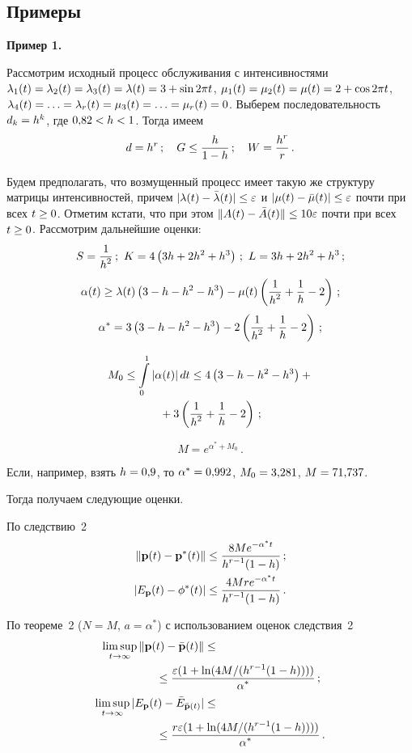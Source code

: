 \begin{multicols}{2}
\vspace*{-9pt}

\section{Примеры}

\noindent
\textbf{Пример 1.}

Рассмотрим исходный процесс обслуживания с интенсивностями 
$\la_1(t)\hm=\la_2(t)\hm=\la_3(t)\hm=\la(t) \hm= 3\hm+\sin{2\pi t}$, 
$\mu_1(t)\hm=\mu_2(t)\hm=  \mu(t) \hm= 2\hm+\cos{2\pi t}$, 
$\la_4(t)=\ldots=\la_r(t)\hm=\mu_3(t)=\ldots=\mu_r(t)\hm=0$. Выберем последовательность  
$d_k\hm=h^k$, где $0{,}82 \hm< h \hm<1$. Тогда имеем
$$
d=h^r\,; \quad G \le \displaystyle\frac{\displaystyle h\mathstrut}{\displaystyle 1-h\mathstrut}\,; \quad W=\displaystyle\frac{\displaystyle h^r\mathstrut}{\displaystyle r\mathstrut}\,.
$$

Будем предполагать, что возмущенный процесс имеет такую же структуру 
мат\-ри\-цы интенсивностей, причем $|\la(t)\hm-\bar{\la}(t)| \hm\le \varepsilon$ 
и  $|\mu(t)\hm-\bar{\mu}(t)| \hm\le \varepsilon$ почти при всех $t \hm\ge 0$. 
Отметим кстати, что при этом $\| A(t)\hm-\bar{A}(t)\| \hm\le 10 \varepsilon$ почти при 
всех $t \hm\ge 0$. Рассмотрим дальнейшие оценки:
$$
S=\displaystyle\frac{\displaystyle 1\mathstrut}{\displaystyle h^2\mathstrut}\,; \ K=4 \left(3h+2h^2+h^3\right)\,; \ L=3h+2h^2+h^3\,;
$$
$$
\alpha(t) \ge \lambda(t)\left(3 - h - h^2 -h^3\right)-\mu(t)\left(\displaystyle\frac{\displaystyle 1\mathstrut}{\displaystyle h^2\mathstrut}+\displaystyle\frac{\displaystyle 1\mathstrut}{\displaystyle h\mathstrut}-2\right)\,;
$$
$$
\alpha^*= 3\left(3 - h - h^2 -h^3\right)-2\left(\displaystyle\frac{\displaystyle 1\mathstrut}{\displaystyle h^2\mathstrut}+\displaystyle\frac{\displaystyle 1\mathstrut}{\displaystyle h\mathstrut}-2\right)\,;
$$


\noindent
\begin{multline*}
M_0 \le \int\limits_0^1 |\alpha(t)|\, dt \le 4\left(3 - h - h^2 -h^3\right)+{}\\
{}+
3\left(\displaystyle\frac{\displaystyle 1\mathstrut}{\displaystyle h^2\mathstrut}+\displaystyle\frac{\displaystyle 1\mathstrut}{\displaystyle h\mathstrut}-2\right)\,;
\end{multline*}

\vspace*{-9pt}

\noindent
$$
M=e^{\alpha^*+M_0}\,.
$$

Если, например, взять 
$h\hm=0{,}9$, то $\alpha^*\hm=0{,}992$, $M_0\hm=3{,}281$, $M\hm=71{,}737$.

Тогда получаем следующие оценки.

По следствию~2
\begin{align*}
 \|{\bf p}(t)- {\bf p^{*}}(t)\| &\le \displaystyle\frac{\displaystyle 8Me^{-\alpha^*t}\mathstrut}{\displaystyle h^{r-1}(1-h)\mathstrut}\,;\\
|E_{\bf p}(t)-\phi^*(t)| &\le  \displaystyle\frac{\displaystyle 4Mre^{-\alpha^*t}\mathstrut}{\displaystyle h^{r-1}(1-h)\mathstrut}\,.
\end{align*}

По теореме~2 ($N=M$, $a=\alpha^*$) с использованием оценок следствия~2
\begin{align*}
\limsup\limits_{t \to \infty} \|{\bf p}(t)- \bar{\bf p}(t)\| &\le{} \notag\\
&\hspace*{-15mm}{}\le \fr{\varepsilon(1+\ln({4M}/({h^{r-1}(1-h)})))}{\alpha^*}\,;\\
\limsup\limits_{t \to \infty}   |E_{\bf p}(t)- \bar{E}_{\bar{\bf p}(t)}| &\le \notag\\
&\hspace*{-15mm}{}\le\fr{r\varepsilon(1+\ln(4M/(h^{r-1}(1-h))))}{\alpha^*}\,.
\end{align*}


\end{multicols}
